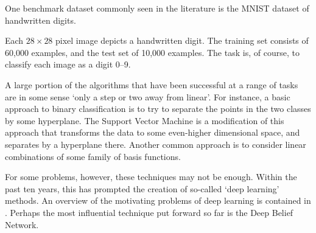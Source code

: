 \documentclass[11pt,titlepage]{article}
\begin{document}
    \begin{example} 
    One benchmark dataset commonly seen in the literature is the MNIST dataset
    of handwritten digits.
    \begin{center}
    \end{center}
    Each $28\times28$ pixel image depicts a handwritten digit.  The training set
    consists of 60,000 examples, and the test set of 10,000 examples.  The task
    is, of course, to classify each image as a digit 0--9.
    \end{example}

    A large portion of the algorithms that have been successful at a range of
    tasks are in some sense `only a step or two away from linear'.  For
    instance, a basic approach to binary classification is to try to separate
    the points in the two classes by some hyperplane.  The Support Vector
    Machine is a modification of this approach that transforms the data to some
    even-higher dimensional space, and separates by a hyperplane there.  Another
    common approach is to consider linear combinations of some family of basis
    functions.

    For some problems, however, these techniques may not be enough.  Within the
    past ten years, this has prompted the creation of so-called `deep learning'
    methods.  An overview of the motivating problems of deep learning is
    contained in \cite{Ben09}.  Perhaps the most influential technique put forward so far is the
    Deep Belief Network.
\end{document}
